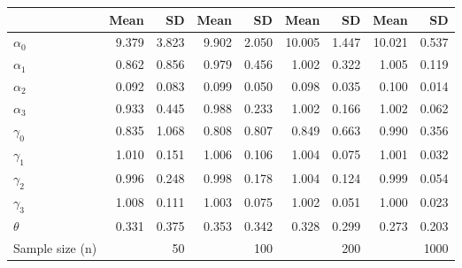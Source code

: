 
\begin{tabular}[t]{lrrrrrrrr}
\toprule
  & Mean & SD & Mean  & SD  & Mean   & SD   & Mean    & SD   \\
\midrule
$\alpha_{0}$ & 9.379 & 3.823 & 9.902 & 2.050 & 10.005 & 1.447 & 10.021 & 0.537\\
$\alpha_{1}$ & 0.862 & 0.856 & 0.979 & 0.456 & 1.002 & 0.322 & 1.005 & 0.119\\
$\alpha_{2}$ & 0.092 & 0.083 & 0.099 & 0.050 & 0.098 & 0.035 & 0.100 & 0.014\\
$\alpha_{3}$ & 0.933 & 0.445 & 0.988 & 0.233 & 1.002 & 0.166 & 1.002 & 0.062\\
$\gamma_{0}$ & 0.835 & 1.068 & 0.808 & 0.807 & 0.849 & 0.663 & 0.990 & 0.356\\
$\gamma_{1}$ & 1.010 & 0.151 & 1.006 & 0.106 & 1.004 & 0.075 & 1.001 & 0.032\\
$\gamma_{2}$ & 0.996 & 0.248 & 0.998 & 0.178 & 1.004 & 0.124 & 0.999 & 0.054\\
$\gamma_{3}$ & 1.008 & 0.111 & 1.003 & 0.075 & 1.002 & 0.051 & 1.000 & 0.023\\
$\theta$ & 0.331 & 0.375 & 0.353 & 0.342 & 0.328 & 0.299 & 0.273 & 0.203\\
Sample size (n) &  & 50 &  & 100 &  & 200 &  & 1000\\
\bottomrule
\end{tabular}
